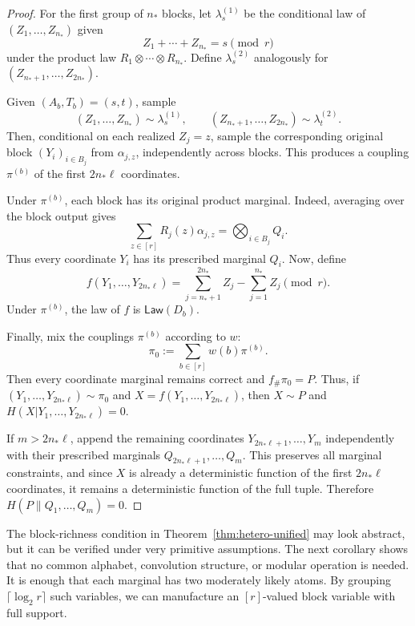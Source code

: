\documentclass[journal]{IEEEtran}
\newcommand{\1}{\mathbf{1}}
\begin{document}
\begin{proof}
For the first group of $n_*$ blocks, let $\lambda_s^{(1)}$ be the conditional law of $(Z_1,\dots,Z_{n_*})$ given
$$
Z_1+\cdots+Z_{n_*}=s \pmod r
$$
under the product law $R_1\otimes\cdots\otimes R_{n_*}$. Define $\lambda_s^{(2)}$ analogously for $(Z_{n_*+1},\dots,Z_{2n_*})$.

Given $(A_b,T_b)=(s,t)$, sample
$$
(Z_1,\dots,Z_{n_*})\sim \lambda_s^{(1)},
\qquad
(Z_{n_*+1},\dots,Z_{2n_*})\sim \lambda_t^{(2)}.
$$
Then, conditional on each realized $Z_j=z$, sample the corresponding original block $(Y_i)_{i\in B_j}$ from $\alpha_{j,z}$, independently across blocks. This produces a coupling $\pi^{(b)}$ of the first $2n_*\ell$ coordinates.

Under $\pi^{(b)}$, each block has its original product marginal. Indeed, averaging over the block output gives
$$
\sum_{z\in[r]}R_j(z)\alpha_{j,z}
=
\bigotimes_{i\in B_j}Q_i.
$$
Thus every coordinate $Y_i$ has its prescribed marginal $Q_i$.
Now, define
$$f(Y_1,\dots,Y_{2n_*\ell})=\sum_{j=n_*+1}^{2n_*} Z_j-\sum_{j=1}^{n_*} Z_j\pmod r.$$
Under $\pi^{(b)}$, the law of $f$ is $\mathsf{Law}(D_b)$.

Finally, mix the couplings $\pi^{(b)}$ according to $w$:
$$
\pi_0:=\sum_{b\in[r]}w(b)\pi^{(b)}.
$$
Then every coordinate marginal remains correct and
$f_{\#}\pi_0=P.$
Thus, if $(Y_1,\dots,Y_{2n_*\ell})\sim\pi_0$ and $X=f(Y_1,\dots,Y_{2n_*\ell})$, then $X\sim P$ and
$H(X| Y_1,\dots,Y_{2n_*\ell})=0.$

If $m>2n_*\ell$, append the remaining coordinates $Y_{2n_*\ell+1},\dots,Y_m$ independently with their prescribed marginals $Q_{2n_*\ell+1},\dots,Q_m$. This preserves all marginal constraints, and since $X$ is already a deterministic function of the first $2n_*\ell$ coordinates, it remains a deterministic function of the full tuple. Therefore
$H(P\|Q_1,\dots,Q_m)=0.$
\end{proof}

The block-richness condition in Theorem~\ref{thm:hetero-unified} may look
abstract, but it can be verified under very primitive assumptions. The next
corollary shows that no common alphabet, convolution structure, or modular
operation is needed. It is enough that each marginal has two moderately likely
atoms. By grouping $\lceil\log_2 r\rceil$ such variables, we can manufacture an
$[r]$-valued block variable with full support.
\end{document}
